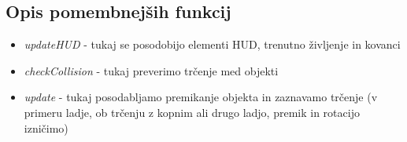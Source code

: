 \documentclass[a4paper]{article}
\begin{document}
\subsection{Opis pomembnejših funkcij}

\begin{itemize}
\item \textit{updateHUD} - tukaj se posodobijo elementi HUD, trenutno življenje in kovanci
\item \textit{checkCollision} - tukaj preverimo trčenje med objekti
\item \textit{update} - tukaj posodabljamo premikanje objekta in zaznavamo trčenje (v primeru ladje, ob trčenju z kopnim ali drugo ladjo, premik in rotacijo izničimo)
\end{itemize}



\small


\end{document}
